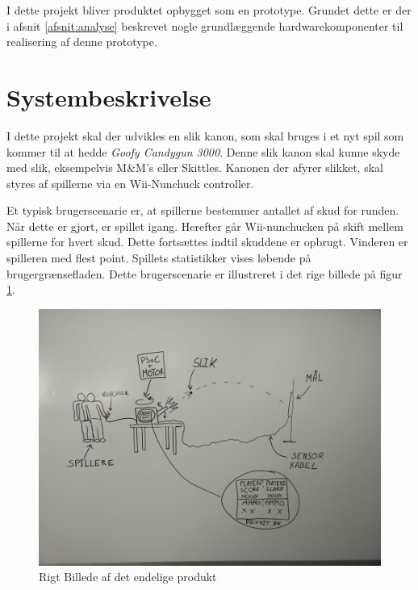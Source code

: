 \noindent I dette projekt bliver produktet opbygget som en prototype. Grundet dette er der i afsnit \ref{afsnit:analyse} beskrevet nogle grundlæggende hardwarekomponenter til realisering af denne prototype.


\section{Systembeskrivelse}
\label{afsnit:systembeskrivelse}
I dette projekt skal der udvikles en slik kanon, som skal bruges i et nyt spil som kommer til at hedde \textit{Goofy Candygun 3000}. Denne slik kanon skal kunne skyde med slik, eksempelvis M\&M’s eller Skittles. Kanonen der afyrer slikket, skal styres af spillerne via en Wii-Nunchuck controller.  \newline

\noindent Et typisk brugerscenarie er, at spillerne bestemmer antallet af skud for runden. Når dette er gjort, er spillet igang. Herefter går Wii-nunchucken på skift mellem spillerne for hvert skud. Dette fortsættes indtil skuddene er opbrugt. Vinderen er spilleren med flest point. Spillets statistikker vises løbende på brugergrænsefladen. Dette brugerscenarie er illustreret i det rige billede på figur \ref{fig:RigtBillede}.

\begin{figure}[H]
	\centering
	\includegraphics[width=\textwidth]{Projektformulering/images/rigtBillede}
	\caption{Rigt Billede af det endelige produkt}
	\label{fig:RigtBillede}
\end{figure}

